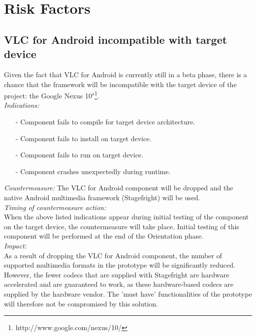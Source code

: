 \section{Risk Factors}
\subsection{VLC for Android incompatible with target device}
Given the fact that VLC for Android is currently still in a beta phase, there is a chance that the framework will be incompatible with the target device of the project: the Google Nexus 10"\footnote{http://www.google.com/nexus/10/}.\\
\newline
\textit{Indications:}
\begin{itemize}
	\item[-]Component fails to compile for target device architecture.
	\item[-]Component fails to install on target device.
	\item[-]Component fails to run on target device.
	\item[-]Component crashes unexpectedly during runtime.
	\\
\end{itemize}
\textit{Countermeasure:}
\newline
The VLC for Android component will be dropped and the native Android multimedia framework (Stagefright) will be used.\\
\newline
\textit{Timing of countermeasure action:}\\
When the above listed indications appear during initial testing of the component on the target device, the countermeasure will take place. Initial testing of this component will be performed at the end of the Orientation phase.\\
\newline
\newline
\textit{Impact:}\\
As a result of dropping the VLC for Android component, the number of supported multimedia formats in the prototype will be significantly reduced. However, the fewer codecs that are supplied with Stagefright are hardware accelerated and are guaranteed to work, as these hardware-based codecs are supplied by the hardware vendor. The 'must have' functionalities of the prototype will therefore not be compromised by this solution.\\

